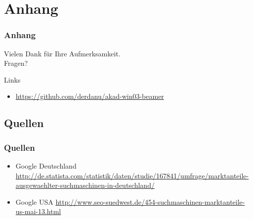 \documentclass[xcolor=dvipsnames]{beamer}
\begin{document}
\section{Anhang}
\begin{frame}
  \frametitle{Anhang} %
	\begin{block}{}	
		\begin{center}
			Vielen Dank für Ihre Aufmerksamkeit. \\
			Fragen?
		\end{center}	
	\end{block}
	\begin{block}{Links}	
		\begin{itemize}
			\item \url{https://github.com/derdanu/akad-win03-beamer}	
		\end{itemize}
	\end{block}
\end{frame}

\subsection{Quellen}
\begin{frame} %
  \frametitle{Quellen} %
 	\begin{itemize}
		\item Google Deutschland \url{http://de.statista.com/statistik/daten/studie/167841/umfrage/marktanteile-ausgewaehlter-suchmaschinen-in-deutschland/}
		\item Google USA \url{http://www.seo-suedwest.de/454-suchmaschinen-marktanteile-us-mai-13.html
}
	\end{itemize}
\end{frame}
\end{document}
